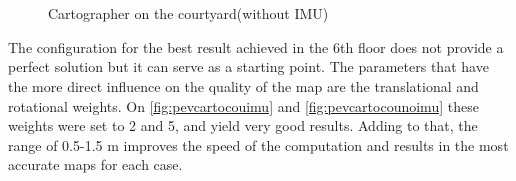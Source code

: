 \begin{figure}[ht]
  \centering
   \quad
   \\
   \quad 
   \\  
  \caption{Cartographer on the courtyard(without IMU)}
  \label{fig:pevcartocounoimu}
\end{figure}

The configuration for the best result achieved in the 6th floor does not provide a perfect solution but it can serve as a starting point. The parameters that have the more direct influence on the quality of the map are the translational and rotational weights. On \autoref{fig:pevcartocouimu}\protect{} and \autoref{fig:pevcartocounoimu}\protect{} these weights were set to 2 and 5, and yield very good results. Adding to that, the range of 0.5-1.5 m improves the speed of the computation and results in the most accurate maps for each case.


